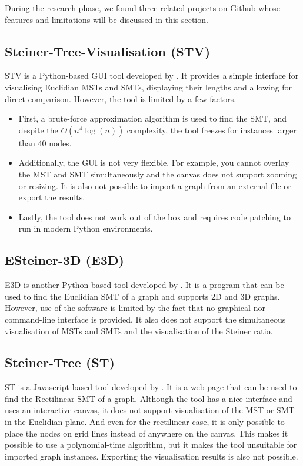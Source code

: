 \documentclass{l4proj}
\begin{document}
During the research phase, we found three related projects on Github whose features and limitations will be discussed in this section.

\subsection{Steiner-Tree-Visualisation (STV)}
STV is a Python-based GUI tool developed by \cite{Steiner-Tree-Visualisation}. It provides a simple interface for visualising Euclidian MSTs and SMTs, displaying their lengths and allowing for direct comparison. However, the tool is limited by a few factors.
\begin{itemize}
    \item First, a brute-force approximation algorithm is used to find the SMT, and despite the ${O(n^4 \log(n))}$ complexity, the tool freezes for instances larger than 40 nodes.
    \item Additionally, the GUI is not very flexible. For example, you cannot overlay the MST and SMT simultaneously and the canvas does not support zooming or resizing. It is also not possible to import a graph from an external file or export the results.
    \item Lastly, the tool does not work out of the box and requires code patching to run in modern Python environments.
\end{itemize}

\subsection{ESteiner-3D (E3D)}
E3D is another Python-based tool developed by \cite{ESteiner-3D}. It is a program that can be used to find the Euclidian SMT of a graph and supports 2D and 3D graphs. However, use of the software is limited by the fact that no graphical nor command-line interface is provided. It also does not support the simultaneous visualisation of MSTs and SMTs and the visualisation of the Steiner ratio.

\subsection{Steiner-Tree (ST)}
ST is a Javascript-based tool developed by \cite{Steiner-Tree}. It is a web page that can be used to find the Rectilinear SMT of a graph. Although the tool has a nice interface and uses an interactive canvas, it does not support visualisation of the MST or SMT in the Euclidian plane. And even for the rectilinear case, it is only possible to place the nodes on grid lines instead of anywhere on the canvas. This makes it possible to use a polynomial-time algorithm, but it makes the tool unsuitable for imported graph instances. Exporting the visualisation results is also not possible.
\end{document}
